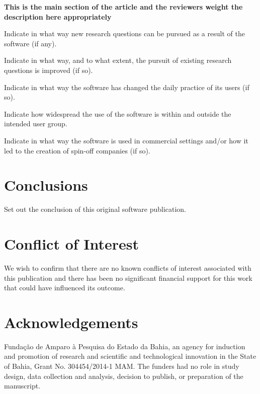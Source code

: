 \documentclass[preprint,12pt, a4paper]{elsarticle}
\begin{document}
\textbf{This is the main section of the article and the reviewers weight the description here appropriately}

Indicate in what way new research questions can be pursued as a result of the software (if any).

Indicate in what way, and to what extent, the pursuit of existing research questions is improved (if so).

Indicate in what way the software has changed the daily practice of its users (if so).

Indicate how widespread the use of the software is within and outside the intended user group.

Indicate in what way the software is used in commercial settings and/or how it led to the creation of spin-off companies (if so).

\section{Conclusions}
\label{conclusions}

Set out the conclusion of this original software publication.

\section{Conflict of Interest}
We wish to confirm that there are no known conflicts of interest associated with this publication and there has been no significant financial support for this work that could have influenced its outcome.


\section*{Acknowledgements}
\label{acknowledgements}

Funda\c{c}\~{a}o de Amparo \`{a} Pesquisa do Estado da Bahia, 
an agency for induction and promotion of research and scientific and 
technological innovation in the State of Bahia, 
Grant No. 304454/2014-1 MAM. 
The funders had no role in study design, data collection and analysis, 
decision to publish, or preparation of the manuscript.

\end{document}
